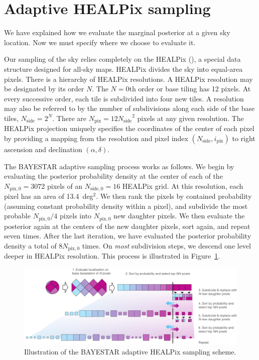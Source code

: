 \documentclass[amsmath,amssymb,aps,prx,reprint,nopreprintnumbers,nofootinbib]{revtex4-1}
\begin{document}
\section{Adaptive HEALPix sampling}
\label{sec:adaptive-sampling}

We have explained how we evaluate the marginal posterior at a given sky location. Now we must specify where we choose to evaluate it.

Our sampling of the sky relies completely on the \acl{HEALPix} (), a special data structure designed for all\nobreakdashes-sky maps. \ac{HEALPix} divides the sky into equal\nobreakdashes-area pixels. There is a hierarchy of \ac{HEALPix} resolutions. A \ac{HEALPix} resolution may be designated by its order $N$. The $N=0$th order or base tiling has 12 pixels. At every successive order, each tile is subdivided into four new tiles. A resolution may also be referred to by the number of subdivisions along each side of the base tiles, $N_\mathrm{side} = 2^N$. There are $N_\mathrm{pix} = 12 {N_\mathrm{side}}^2$ pixels at any given resolution. The \ac{HEALPix} projection uniquely specifies the coordinates of the center of each pixel by providing a mapping from the resolution and pixel index $(N_\mathrm{side}, i_\mathrm{pix})$ to right ascension and declination $(\alpha, \delta)$.

The \ac{BAYESTAR} adaptive sampling process works as follows. We begin by evaluating the posterior probability density at the center of each of the $N_{\mathrm{pix},0} = 3072$ pixels of an $N_{\mathrm{side},0}=16$ \ac{HEALPix} grid. At this resolution, each pixel has an area of 13.4~deg$^2$. We then rank the pixels by contained probability (assuming constant probability density within a pixel), and subdivide the most probable $N_{\mathrm{pix},0}/4$ pixels into $N_{\mathrm{pix},0}$ new daughter pixels. We then evaluate the posterior again at the centers of the new daughter pixels, sort again, and repeat seven times. After the last iteration, we have evaluated the posterior probability density a total of $8 N_{\mathrm{pix},0}$ times. On \emph{most} subdivision steps, we descend one level deeper in \ac{HEALPix} resolution. This process is illustrated in Figure~\ref{fig:adaptive-illustration}.

\begin{figure}
    \includegraphics[width=\textwidth]{illustration}
    \caption{\label{fig:adaptive-illustration}Illustration of the \ac{BAYESTAR} adaptive HEALPix sampling scheme.}
\end{figure}
\end{document}
